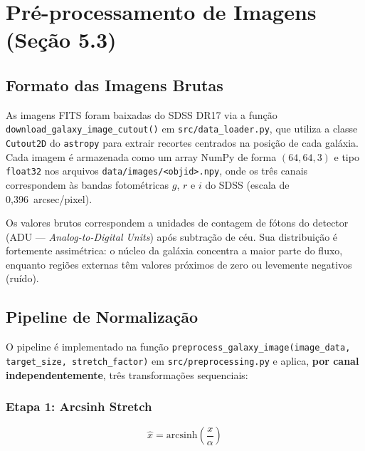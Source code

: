 \documentclass[12pt, a4paper]{article}
\begin{document}
\section{Pré-processamento de Imagens (Seção 5.3)}

\subsection{Formato das Imagens Brutas}

As imagens FITS foram baixadas do SDSS DR17 via a função
\texttt{download\_galaxy\_image\_cutout()} em \texttt{src/data\_loader.py},
que utiliza a classe \texttt{Cutout2D} do \texttt{astropy} para extrair
recortes centrados na posição de cada galáxia. Cada imagem é armazenada como
um array NumPy de forma $(64, 64, 3)$ e tipo \texttt{float32} nos arquivos
\texttt{data/images/<objid>.npy}, onde os três canais correspondem às bandas
fotométricas $g$, $r$ e $i$ do SDSS (escala de 0,396~arcsec/pixel).

Os valores brutos correspondem a unidades de contagem de fótons do detector
(ADU --- \textit{Analog-to-Digital Units}) após subtração de céu. Sua
distribuição é fortemente assimétrica: o núcleo da galáxia concentra a
maior parte do fluxo, enquanto regiões externas têm valores próximos de zero
ou levemente negativos (ruído).

\subsection{Pipeline de Normalização}

O pipeline é implementado na função
\texttt{preprocess\_galaxy\_image(image\_data, target\_size, stretch\_factor)}
em \texttt{src/preprocessing.py} e aplica, \textbf{por canal independentemente},
três transformações sequenciais:

\subsubsection{Etapa 1: Arcsinh Stretch}

\begin{equation}
  \hat{x} = \text{arcsinh}\!\left(\frac{x}{\alpha}\right)
\end{equation}
\end{document}
